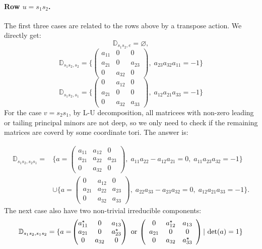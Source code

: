 \documentclass[12pt]{amsart}
\newcommand{\D}{\mathbb D}
\theoremstyle{plain}
\theoremstyle{definition}
\theoremstyle{remark}
\begin{document}
\paragraph{\bf Row \(u=s_1s_2\).}

The first three cases are related to the rows above by a transpose action. We directly get:
\[
\D_{s_1s_2,e}=\varnothing,
\]
\[
\D_{s_1s_2,s_2}
=\{\!\left(
\begin{array}{ccc}
a_{11}&0&0\\
a_{21}&0&a_{23}\\
0&a_{32}&0
\end{array}
\right)\!,\;a_{23}a_{32}a_{11}=-1\}
\]
\[
\D_{s_1s_2,s_1}
=\{\!\left(
\begin{array}{ccc}
0&a_{12}&0\\
a_{21}&0&0\\
0&a_{32}&a_{33}
\end{array}
\right)\!,\;a_{12}a_{21}a_{33}=-1\}
\]
For the case $v=s_2s_1$, by L-U decomposition, all matricees with non-zero leading or tailing principal minors are not deep, so we only need to check if the remaining matrices are coverd by some coordinate tori. The answer is: 

\[
\begin{aligned}
\D_{s_1s_2, s_2s_1}
={}&
\{a=\!\left(
\begin{array}{ccc}
a_{11}&a_{12}&0\\
a_{21}&a_{22}&a_{23}\\
0&a_{32}&0
\end{array}
\right)\!,\;a_{11}a_{22}-a_{12}a_{21}=0,\;a_{11}a_{23}a_{32}=-1\}\\
&\cup
\{a=\!\left(
\begin{array}{ccc}
0&a_{12}&0\\
a_{21}&a_{22}&a_{23}\\
0&a_{32}&a_{33}
\end{array}
\right)\!,\;a_{22}a_{33}-a_{23} a_{32}=0,\;a_{12}a_{21}a_{33}=-1\}.
\end{aligned}
\]
The next case also have two non-trivial irreducible components:
\[
\D_{s_1s_2,s_1s_2}
=\{a=\!
\begin{pmatrix}
a_{11}^\star&0&a_{13} \\
a_{21}&0&a_{23}^\star \\
0&a_{32}&0
\end{pmatrix}
\textup{ or }\!\left(
\begin{array}{ccc}
0&a_{12}^\star&a_{13}\\
a_{21}&0&0\\
0&a_{32}&a_{33}^\star
\end{array}
\right)| \textup{ det}(a)=1\}
\]
\end{document}
